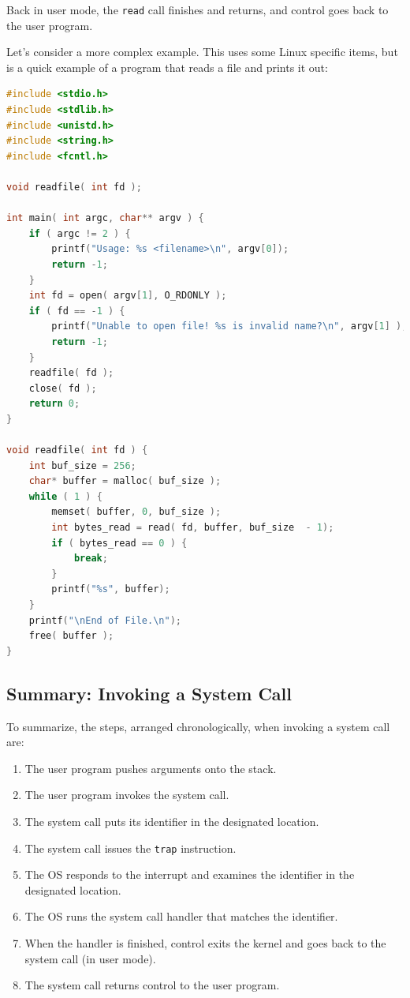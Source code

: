 \documentclass[a4paper]{report}
\begin{document}
Back in user mode, the \texttt{read} call finishes and returns, and control goes back to the user program.

Let's consider a more complex example. This uses some Linux specific items, but is a quick example of a program that reads a file and prints it out:

\begin{lstlisting}[language=C]
#include <stdio.h>
#include <stdlib.h>
#include <unistd.h>
#include <string.h>
#include <fcntl.h>

void readfile( int fd );

int main( int argc, char** argv ) {
    if ( argc != 2 ) {
        printf("Usage: %s <filename>\n", argv[0]);
        return -1;
    }
    int fd = open( argv[1], O_RDONLY );
    if ( fd == -1 ) {
        printf("Unable to open file! %s is invalid name?\n", argv[1] );
        return -1;
    }
    readfile( fd );
    close( fd );
    return 0;
}

void readfile( int fd ) {
    int buf_size = 256;
    char* buffer = malloc( buf_size );
    while ( 1 ) {
        memset( buffer, 0, buf_size );
        int bytes_read = read( fd, buffer, buf_size  - 1);  
        if ( bytes_read == 0 ) {
            break; 
        }     
        printf("%s", buffer);
    }
    printf("\nEnd of File.\n");
    free( buffer );
}
\end{lstlisting}


\subsection*{Summary: Invoking a System Call}

To summarize, the steps, arranged chronologically, when invoking a system call are:
\begin{enumerate}
	\item The user program pushes arguments onto the stack.
	\item The user program invokes the system call.
	\item The system call puts its identifier in the designated location.
	\item The system call issues the \texttt{trap} instruction.
	\item The OS responds to the interrupt and examines the identifier in the designated location.
	\item The OS runs the system call handler that matches the identifier.
	\item When the handler is finished, control exits the kernel and goes back to the system call (in user mode).
	\item The system call returns control to the user program.

\end{enumerate}
\end{document}
